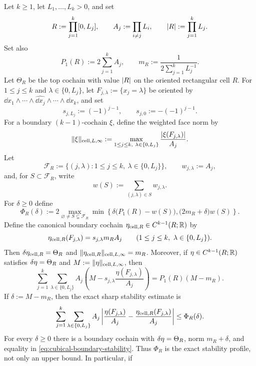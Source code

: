 \begin{theorem}
\label{thm:cubical-boundary-readout}
Let $k\ge 1$, let $L_1,\dots,L_k>0$, and set
\[
R:=\prod_{j=1}^k[0,L_j],
\qquad
A_j:=\prod_{i\ne j}L_i,
\qquad
\lvert R \rvert:=\prod_{j=1}^kL_j.
\]
Set also
\[
P_1(R):=2\sum_{j=1}^kA_j,
\qquad
m_R:=\frac{1}{2\sum_{j=1}^kL_j^{-1}}.
\]
Let $\Theta_R$ be the top cochain with value $\lvert R \rvert$ on the oriented
rectangular cell $R$. For $1\le j\le k$ and $\lambda\in\{0,L_j\}$, let
$F_{j,\lambda}:=\{x_j=\lambda\}$ be oriented by
$\dd x_1\wedge\cdots\wedge\widehat{\dd x_j}\wedge\cdots\wedge\dd x_k$, and set
\[
s_{j,L_j}:=(-1)^{j-1},
\qquad
s_{j,0}:=-(-1)^{j-1}.
\]
For a boundary $(k-1)$-cochain $\xi$, define the weighted face norm by
\[
\lVert \xi \rVert_{\mathrm{cell},L,\infty}:=
\max_{1\le j\le k,\ \lambda\in\{0,L_j\}}
\frac{\lvert \xi(F_{j,\lambda}) \rvert}{A_j}.
\]
Let
\[
\mathcal F_R:=\{(j,\lambda):1\le j\le k,\
\lambda\in\{0,L_j\}\},
\qquad
w_{j,\lambda}:=A_j,
\]
and, for $S\subset\mathcal F_R$, write
\[
w(S):=\sum_{(j,\lambda)\in S}w_{j,\lambda}.
\]
For $\delta\ge0$ define
\begin{equation}
\label{eq:cubical-sharp-profile}
\Phi_R(\delta):=
2\max_{\varnothing\ne S\subsetneq\mathcal F_R}
\min\left\{
\delta\bigl(P_1(R)-w(S)\bigr),
\bigl(2m_R+\delta\bigr)w(S)
\right\}.
\end{equation}
Define the canonical boundary cochain $\eta_{\mathrm{cell},R}\in C^{k-1}(R;\mathbb{R})$ by
\[
\eta_{\mathrm{cell},R}(F_{j,\lambda})
=
s_{j,\lambda}m_RA_j
\qquad
(1\le j\le k,\ \lambda\in\{0,L_j\}).
\]
Then $\delta\eta_{\mathrm{cell},R}=\Theta_R$ and
$\lVert \eta_{\mathrm{cell},R} \rVert_{\mathrm{cell},L,\infty}=m_R$. Moreover, if
$\eta\in C^{k-1}(R;\mathbb{R})$ satisfies $\delta\eta=\Theta_R$ and
$M:=\lVert \eta \rVert_{\mathrm{cell},L,\infty}$, then
\begin{equation}
\label{eq:cubical-deficit-identity}
\sum_{j=1}^k\sum_{\lambda\in\{0,L_j\}}
A_j\left(M-s_{j,\lambda}\frac{\eta(F_{j,\lambda})}{A_j}\right)
=
P_1(R)(M-m_R).
\end{equation}
If $\delta:=M-m_R$, then the exact sharp stability estimate is
\begin{equation}
\label{eq:cubical-boundary-stability}
\sum_{j=1}^k\sum_{\lambda\in\{0,L_j\}}
A_j\left\lvert
\frac{\eta(F_{j,\lambda})}{A_j}
-
\frac{\eta_{\mathrm{cell},R}(F_{j,\lambda})}{A_j}
\right\rvert
\le
\Phi_R(\delta).
\end{equation}
For every $\delta\ge0$ there is a boundary cochain with
$\delta\eta=\Theta_R$, norm $m_R+\delta$, and equality in
\eqref{eq:cubical-boundary-stability}.  Thus $\Phi_R$ is the exact stability
profile, not only an upper bound.  In particular, if

\end{theorem}
